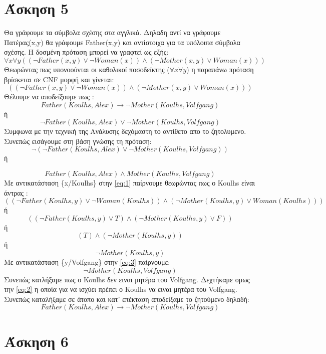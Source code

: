 \documentclass[12pt]{article}
\begin{document}
	\noindent
	
	\section*{Άσκηση 5}
	Θα γράφουμε τα σύμβολα σχέσης στα αγγλικά. Δηλαδη αντί να γράφουμε Πατέρας(\textlatin{x,y}) θα γράφουμε \textlatin{Father(x,y)} και αντίστοιχα για τα υπόλοιπα σύμβολα σχέσης. Η δοσμένη πρόταση μπορεί να γραφτεί ως εξής: \\
	\noindent
	\[  \forall x \forall y ((\neg Father(x,y) \lor \neg Woman(x)) \wedge (\neg Mother(x,y) \lor Woman(x)) )\]
	Θεωρώντας πως υπονοούνται οι καθολικοί ποσοδείκτης ($ \forall x \forall y$) η παραπάνω πρόταση βρίσκεται σε \textlatin{CNF} μορφή και γίνεται:\\
	
	\begin{equation} \label{eq:1} \tag{5.1}
		((\neg Father(x,y) \lor \neg Woman(x)) \wedge (\neg Mother(x,y) \lor Woman(x)) )
	\end{equation}
	Θέλουμε να αποδείξουμε πως :
	\[ 
		Father(Koulhs,Alex) \rightarrow \neg Mother(Koulhs,Volfgang) 
	\]
	\noindent 
	ή 
	\[
		 \neg Father(Koulhs,Alex) \lor \neg Mother(Koulhs,Volfgang)
	\]
	\noindent
	Συμφωνα με την τεχνική της Ανάλυσης δεχόμαστη το αντίθετο απο το ζητολυμενο. Συνεπώς εισάγουμε στη βάση γνώσης τη πρόταση:
	\[
		\neg (\neg Father(Koulhs,Alex) \lor \neg Mother(Koulhs,Volfgang))
	\]
	\noindent 
	ή
	
	\begin{equation} \label{eq:2} \tag{5.2}
		 Father(Koulhs,Alex) \wedge  Mother(Koulhs,Volfgang)
	\end{equation}
	\noindent
	Με αντικατάσταση {\textlatin{ \{x/Koulhs\}}} στην \eqref{eq:1} παίρνουμε θεωρώντας πως ο \textlatin{Koulhs} είναι άντρας :
	\[
		((\neg Father(Koulhs,y) \lor \neg Woman(Koulhs)) \wedge (\neg Mother(Koulhs,y) \lor Woman(Koulhs)) )
	\]
	\noindent
	ή
	\[
		((\neg Father(Koulhs,y) \lor T) \wedge (\neg Mother(Koulhs,y) \lor F) )
	\]
	\noindent
	ή
	\[
		(T) \wedge (\neg Mother(Koulhs,y) )
	\]
	\noindent
	ή
	\begin{equation} \label{eq:3} \tag{5.3}
		\neg Mother(Koulhs,y)
	\end{equation}
	\noindent
	Με αντικατάσταση {\textlatin{ \{y/Volfgang\}}} στην \eqref{eq:3} παίρνουμε:
	\begin{equation} \label{eq:4} \tag{5.4}
		\neg Mother(Koulhs, Volfgang)
	\end{equation}
	\noindent
	Συνεπώς κατλήξαμε πως ο \textlatin{Koulhs} δεν ειναι μητέρα του \textlatin{Volfgang}. Δεχτήκαμε ομως την \eqref{eq:2} η οποία για να ισχύει πρέπει ο 
	\textlatin{Koulhs} να ειναι μητέρα του \textlatin{Volfgang}. Συνεπώς καταλήξαμε σε άτοπο και κατ' επέκταση αποδείξαμε το ζητούμενο δηλαδή:
	\[
		Father(Koulhs,Alex) \rightarrow \neg Mother(Koulhs,Volfgang) 
	\]
	
	\section*{Άσκηση 6}
	
	
	
\end{document}
